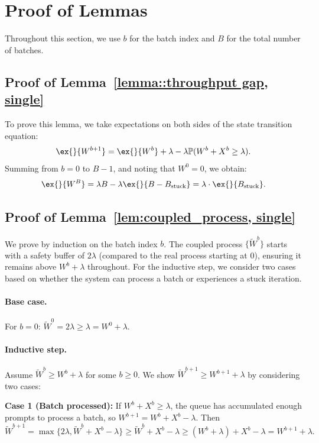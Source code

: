 \section{Proof of Lemmas}\label{sec:pf_lemmas}

Throughout this section, we use $b$ for the batch index and $B$ for the total number of batches.

\subsection{Proof of Lemma~\ref{lemma::throughput gap, single}}\label{appendix_lemma::proof of throughput gap, single}
To prove this lemma, we take expectations on both sides of the state transition equation:
$$\ex{}{W^{b+1}}=\ex{}{W^b}+\lambda - \lambda \mathbb{P}(W^b+X^b\geq \lambda).$$
Summing from $b=0$ to $B-1$, and noting that $W^0=0$, we obtain:
$$\ex{}{W^B}=\lambda B - \lambda \ex{}{B-B_{\text{stuck}}}=\lambda\cdot \ex{}{B_{\text{stuck}}}.$$

\subsection{Proof of Lemma~\ref{lem:coupled_process, single}}\label{appendix_lemma::proof of coupled_process, single}
We prove by induction on the batch index $b$. The coupled process $\{\tilde{W}^b\}$ starts with a safety buffer of $2\lambda$ (compared to the real process starting at 0), ensuring it remains above $W^b + \lambda$ throughout. For the inductive step, we consider two cases based on whether the system can process a batch or experiences a stuck iteration.

\paragraph{Base case.} For $b = 0$: $\tilde{W}^0=2\lambda\geq \lambda=W^0+\lambda$.

\paragraph{Inductive step.} Assume $\tilde{W}^b \geq W^b + \lambda$ for some $b \geq 0$. We show $\tilde{W}^{b+1} \geq W^{b+1} + \lambda$ by considering two cases:

\textbf{Case 1 (Batch processed):} If $W^b + X^b \geq \lambda$, the queue has accumulated enough prompts to process a batch, so $W^{b+1} = W^b + X^b - \lambda$. Then
$$\tilde{W}^{b+1}=\max\{ 2\lambda, \tilde{W}^b + X^b - \lambda \}\geq \tilde{W}^b + X^b - \lambda\geq( W^b+\lambda )+ X^b - \lambda=W^{b+1}+\lambda.$$

